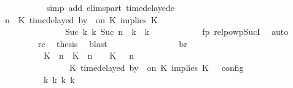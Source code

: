 \begin{isabellebody}
\ \ \ \ \ \ \ \ \ \ \isamarkupfalse%
\ {\isacharparenleft}simp\ add{\isacharcolon}\ elims{\isacharunderscore}part\ timedelayed{\isacharunderscore}e{}{\isacharparenright}\isanewline
\ \ \ \ \ \ \ \ \isamarkupfalse%
\ {\isacartoucheopen}{\isacharparenleft}{\isasymGamma}{\isacharcomma}\ n\ {\isasymturnstile}\ {\isacharparenleft}{\isacharparenleft}K\ time{\isacharminus}delayed\ by\ {\isasymdelta}{\isasymtau}\ on\ K\ implies\ K\ {\isacharhash}\ {\isasymPsi}{\isacharparenright}\ {\isasymtriangleright}\ {\isasymPhi}{\isacharparenright}\isanewline
\ \ \ \ \ \ \ \ \ \ \ \ \ \ \ \ {\isasymhookrightarrow}\isactrlbsup Suc\ k\isactrlesup \ {\isacharparenleft}{\isasymGamma}\isactrlsub k{\isacharcomma}\ Suc\ n\ {\isasymturnstile}\ {\isasymPsi}\isactrlsub k\ {\isasymtriangleright}\ {\isasymPhi}\isactrlsub k{\isacharparenright}{\isacartoucheclose}\isanewline
\ \ \ \ \ \ \ \ \ \ \isamarkupfalse%
\ fp\ relpowp{\isacharunderscore}Suc{\isacharunderscore}I{}\ \isamarkupfalse%
\ auto\isanewline
\ \ \ \ \ \ \ \ \isamarkupfalse%
\ rc\ \isamarkupfalse%
\ {\isacharquery}thesis\ \isamarkupfalse%
\ blast\isanewline
\ \ \ \ \ \ \isamarkupfalse%
\isanewline
\ \ \ \ \ \ \isamarkupfalse%
\ \isamarkupfalse%
\ br{}{\isacharcolon}\isanewline
\ \ \ \ \ \ \ \ {\isacartoucheopen}{\isasymrho}\ {\isasymin}\ {\isasymlbrakk}\ {\isacharparenleft}{\isacharparenleft}K\ {\isasymUp}\ n{\isacharparenright}\ {\isacharhash}\ {\isacharparenleft}K\ {\isacharat}\ n\ {\isasymoplus}\ {\isasymdelta}{\isasymtau}\ {\isasymRightarrow}\ K\ {\isacharhash}\ {\isasymGamma}{\isacharparenright}{\isacharcomma}\ n\isanewline
\ \ \ \ \ \ \ \ \ \ \ \ \ \ {\isasymturnstile}\ {\isasymPsi}\ {\isasymtriangleright}\ {\isacharparenleft}{\isacharparenleft}K\ time{\isacharminus}delayed\ by\ {\isasymdelta}{\isasymtau}\ on\ K\ implies\ K\ {\isacharhash}\ {\isasymPhi}{\isacharparenright}\ {\isasymrbrakk}\isactrlsub c\isactrlsub o\isactrlsub n\isactrlsub f\isactrlsub i\isactrlsub g\isanewline
\ \ \ \ \ \ \ \ \ \ {\isasymLongrightarrow}\ {\isasymexists}{\isasymGamma}\isactrlsub k\ {\isasymPsi}\isactrlsub k\ {\isasymPhi}\isactrlsub k\ k{\isachardot}\isanewline

\end{isabellebody}
